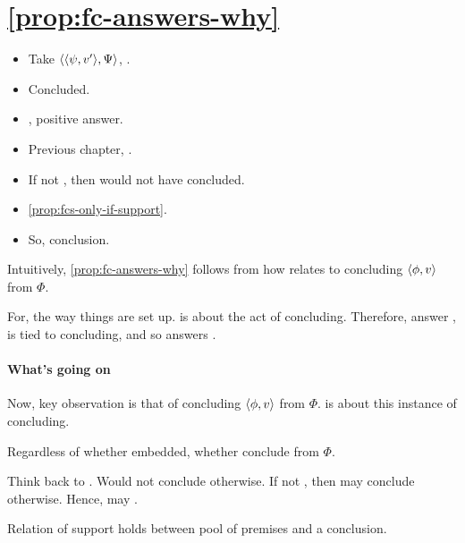 \section{\autoref{prop:fc-answers-why}}
\label{sec:simple-argument}


\begin{note}
  \begin{itemize}
  \item Take \(\langle \langle \psi, v' \rangle, \Psi \rangle\), \requ{}.
  \item Concluded.
  \item \qzS{}, positive answer.
  \item Previous chapter, \ptivityQ{}.
  \item If not \fc{}, then would not have concluded.
  \item \autoref{prop:fcs-only-if-support}.
  \item So, conclusion.
  \end{itemize}
\end{note}

\begin{note}
  Intuitively, \autoref{prop:fc-answers-why} follows from how \qzS{} relates to concluding \(\langle \phi, v \rangle\) from \(\Phi\).

  For, the way things are set up.
  \qzS{} is about the act of concluding.
  Therefore, answer \qzS{}, is tied to concluding, and so \support{} answers \qWhyV{}.
\end{note}

\paragraph{What's going on}

\begin{note}
  Now, key observation is that \requ{} of concluding \(\langle \phi, v \rangle\) from \(\Phi\).
  \qzS{} is about this instance of concluding.

  Regardless of whether embedded, whether conclude from \(\Phi\).

  Think back to \requ{}.
  Would not conclude otherwise.
  If not \fc{}, then may conclude otherwise.
  Hence, may \deadEnd{} \support{}.
\end{note}

\begin{note}
  \begin{observation}
    Relation of support holds between pool of premises and a conclusion.
  \end{observation}
\end{note}

